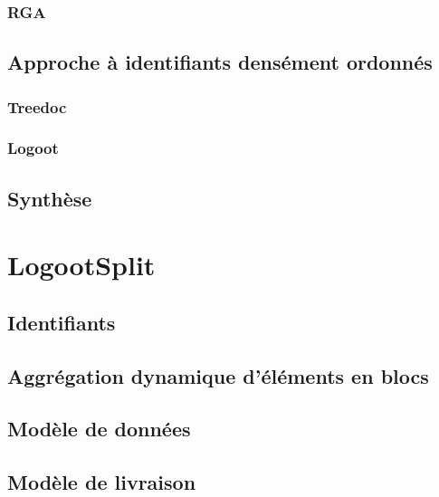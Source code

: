 \subsubsection{\acl{RGA}}


\subsection{Approche à identifiants densément ordonnés}

\subsubsection{Treedoc}


\subsubsection{Logoot}



\subsection{Synthèse}


\section{LogootSplit}


\subsection{Identifiants}


\subsection{Aggrégation dynamique d'éléments en blocs}


\subsection{Modèle de données}


\subsection{Modèle de livraison}


